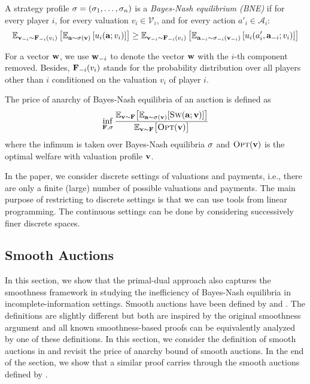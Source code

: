 \begin{definition}
A strategy profile $\mathbf{\sigma} = (\sigma_{1}, \ldots, \sigma_{n})$ is a 
\emph{Bayes-Nash equilibrium (BNE)}  if for every player $i$, for every valuation $v_{i} \in \mathcal{V}_{i}$, and 
for every action $a'_{i} \in \mathcal{A}_{i}$:
\begin{align*}
\mathbb{E}_{\mathbf{v}_{-i} \sim \mathbf{F}_{-i}(v_{i})} \left[ \mathbb{E}_{\mathbf{a} \sim \mathbf{\sigma}(\mathbf{v})} \left[ u_{i}(\mathbf{a};v_{i}) \right] \right]
\geq 
\mathbb{E}_{\mathbf{v}_{-i} \sim \mathbf{F}_{-i}(v_{i})} \left[ \mathbb{E}_{\mathbf{a}_{-i} \sim \mathbf{\sigma}_{-i}(\mathbf{v}_{-i})} \left[ u_{i}(a'_{i},\mathbf{a}_{-i};v_{i}) \right] \right]
\end{align*}
\end{definition}
%
For a vector $\mathbf{w}$, we use $\mathbf{w}_{-i}$ to denote the vector $\mathbf{w}$ with the $i$-th component removed. 
Besides, $\mathbf{F}_{-i}(v_{i})$ stands for the probability distribution over all players other than $i$
conditioned on the valuation $v_{i}$ of player $i$. 

The price of anarchy of Bayes-Nash equilibria of an auction is defined as 
$$
\inf_{\mathbf{F}, \mathbf{\sigma}} \frac{\mathbb{E}_{\mathbf{v} \sim \mathbf{F}}\bigl[ \mathbb{E}_{\mathbf{a} \sim \mathbf{\sigma}(\mathbf{v})}[\textsc{Sw}(\mathbf{a};\mathbf{v})] \bigr]}{\mathbb{E}_{\mathbf{v} \sim \mathbf{F}} \bigl[ \textsc{Opt}(\mathbf{v})\bigr]}
$$
where the infimum is taken over Bayes-Nash equilibria $\mathbf{\sigma}$ and 
$\textsc{Opt}(\mathbf{v})$ is the optimal welfare with valuation profile $\mathbf{v}$.

In the paper, we consider discrete settings of valuations and payments, i.e., 
there are only a finite (large) number of possible valuations
and payments. The main purpose of restricting to discrete settings is that we can use tools from linear programming.
The continuous settings can be done by considering successively finer discrete spaces.   


\subsection{Smooth Auctions}	\label{sec:smooth-auction}

In this section, we show that the primal-dual approach also captures the smoothness framework in 
studying the inefficiency of Bayes-Nash equilibria in incomplete-information settings. 
Smooth auctions have been defined by \citet{Roughgarden15:The-price-of-anarchy} 
and \citet{SyrgkanisTardos13:Composable-and-efficient}. The definitions are slightly different but both are inspired 
by the original smoothness argument \cite{Roughgarden15:Intrinsic-robustness} and 
all known smoothness-based proofs can be equivalently analyzed by one of these definitions.  
In this section, we consider the definition of smooth auctions in \cite{Roughgarden15:The-price-of-anarchy}
and revisit the price of anarchy bound of smooth auctions.
In the end of the section, we show that a similar proof carries through the smooth auctions defined by
\citet{SyrgkanisTardos13:Composable-and-efficient}.
  

